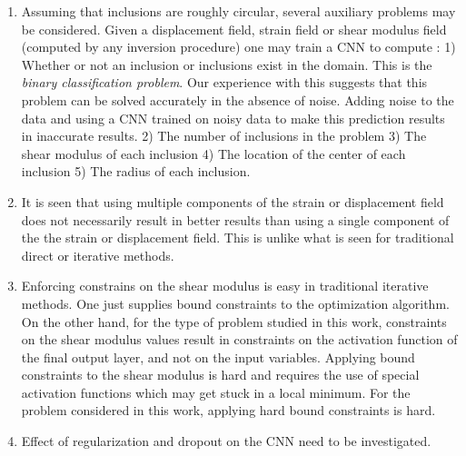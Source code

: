 \documentclass[12pt]{article}
\begin{document}
\begin{enumerate}
\item{Assuming that inclusions are roughly circular, several auxiliary problems may be considered. Given a displacement field, strain field or shear modulus field (computed by any inversion procedure) one may train a CNN to compute : 1) Whether or not an inclusion or inclusions exist  in the domain. This is the \textit{binary classification problem}. Our experience with this suggests that this problem can be solved accurately in the absence of noise.  Adding noise to the data and using a CNN trained on noisy data to make this prediction results in inaccurate results. 2) The number of inclusions in the problem 3) The shear modulus of each inclusion 4) The location of the center of each inclusion 5) The radius of each inclusion. }
\item{It is seen that using multiple components of the strain or displacement field does not necessarily result in better results than using a single component of the the strain or displacement field. This is unlike what is seen for traditional direct or iterative methods.}
\item{Enforcing constrains on the shear modulus is easy in traditional iterative methods. One just supplies bound constraints to the optimization algorithm. On the other hand, for the type of problem studied in this work, constraints on the shear modulus values result in constraints on the activation function of the final output layer, and not on the input variables. Applying bound constraints to the shear modulus is hard and requires the use of special activation functions which may get stuck in a local minimum. For the problem considered in this work, applying hard bound constraints is hard.}
\item{Effect of regularization and dropout on the CNN need to be investigated.}
\end{enumerate}
\clearpage
{}

\end{document}
